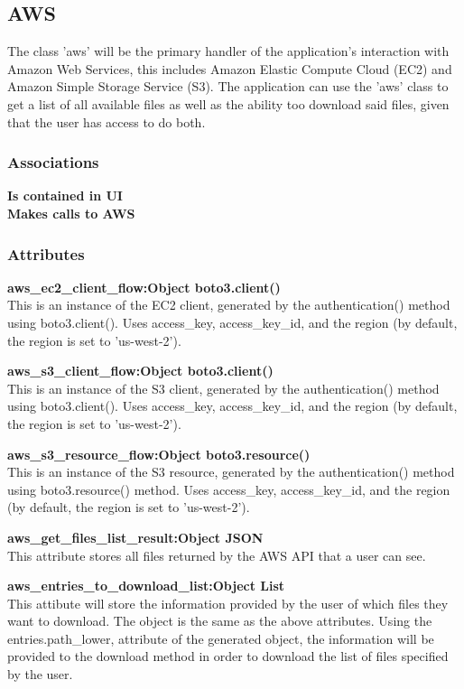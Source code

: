 \subsection{AWS}
The class 'aws' will be the primary handler of the application's interaction with Amazon Web Services,
this includes Amazon Elastic Compute Cloud (EC2) and Amazon Simple Storage Service (S3). The application
can use the 'aws' class to get a list of all available files as well as the ability too download said files, 
given that the user has access to do both.

\subsubsection{Associations}
\textbf{Is contained in UI} \\

\textbf{Makes calls to AWS} \\

\subsubsection{Attributes}
\textbf{aws\_ec2_client\_flow:Object boto3.client()} \\
    This is an instance of the EC2 client, generated by the authentication() method using boto3.client(). Uses access_key, access_key_id, and the region (by default, the region is set to 'us-west-2'). 

\textbf{aws\_s3_client\_flow:Object boto3.client()} \\
    This is an instance of the S3 client, generated by the authentication() method using boto3.client(). Uses access_key, access_key_id, and the region (by default, the region is set to 'us-west-2').

\textbf{aws\_s3_resource\_flow:Object boto3.resource()} \\
    This is an instance of the S3 resource, generated by the authentication() method using boto3.resource() method. Uses access_key, access_key_id, and the region (by default, the region is set to 'us-west-2').

\textbf{aws\_get\_files\_list\_result:Object JSON} \\
    This attribute stores all files returned by the AWS API that a user can see.

\textbf{aws\_entries\_to\_download\_list:Object List} \\
    This attibute will store the information provided by the user of which files they want to download. The object is the same as the above 
    attributes. Using the entries.path_lower, attribute of the generated object, the information will be provided to the download method in 
    order to download the list of files specified by the user.

